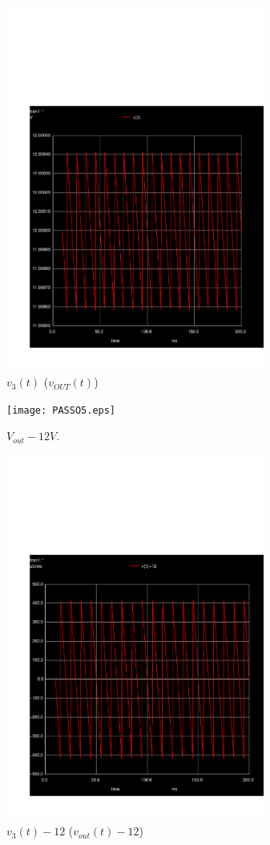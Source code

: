 \begin{figure}[h] \centering
	\vspace{-2cm}
	\includegraphics[height=12cm]{../sim/trans42.pdf}
	\caption{$v_{3}(t)$ ($v_{OUT}(t)$)}
	\vspace{-3cm}
\end{figure}

\newpage

\begin{figure}[h] \centering
	\texttt{[image: PASSO5.eps]}
	\caption{$V_{out} - 12V$.}
\end{figure}
  	
\begin{figure}[h] \centering
	\vspace{-2cm}
	\includegraphics[height=12cm]{../sim/trans5.pdf}
	\caption{$v_{3}(t)-12$ ($v_{out}(t)-12$)}
	\vspace{-3cm}
\end{figure}


